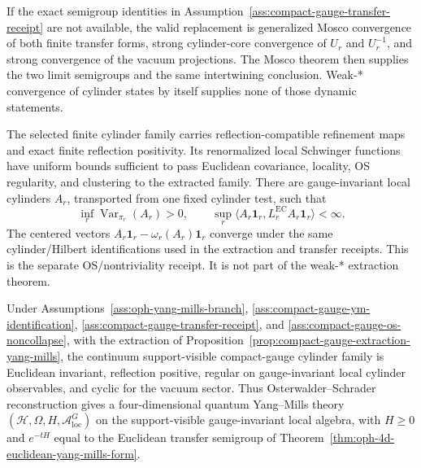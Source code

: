 \begin{remark}
\label{rem:compact-gauge-mosco-alternative}
If the exact semigroup identities in Assumption~\ref{ass:compact-gauge-transfer-receipt} are not
available, the valid replacement is generalized Mosco convergence of both finite transfer forms,
strong cylinder-core convergence of \(U_r\) and \(U_r^{-1}\), and strong convergence of the
vacuum projections. The Mosco theorem then supplies the two limit semigroups and the same
intertwining conclusion. Weak-* convergence of cylinder states by itself supplies none of those
dynamic statements.
\end{remark}

\begin{assumption}
\label{ass:compact-gauge-os-noncollapse}
The selected finite cylinder family carries reflection-compatible refinement maps and exact finite
reflection positivity. Its renormalized local Schwinger functions have uniform bounds sufficient
to pass Euclidean covariance, locality, OS regularity, and clustering to the extracted family.
There are gauge-invariant local cylinders \(A_r\), transported from one fixed cylinder
test, such that
\[
\inf_r\operatorname{Var}_{\pi_r}(A_r)>0,
\qquad
\sup_r\langle A_r\mathbf 1_r,L_r^{\mathrm{EC}}A_r\mathbf 1_r\rangle<\infty.
\]
The centered vectors \(A_r\mathbf 1_r-\omega_r(A_r)\mathbf 1_r\) converge under the same
cylinder/Hilbert identifications used in the extraction and transfer receipts.
This is the separate OS/nontriviality receipt. It is not part of the weak-* extraction theorem.
\end{assumption}

\begin{theorem}
\label{thm:compact-gauge-os-reconstruction}
Under Assumptions~\ref{ass:oph-yang-mills-branch},
\ref{ass:compact-gauge-ym-identification},
\ref{ass:compact-gauge-transfer-receipt}, and
\ref{ass:compact-gauge-os-noncollapse}, with the extraction of
Proposition~\ref{prop:compact-gauge-extraction-yang-mills}, the continuum support-visible
compact-gauge cylinder family is Euclidean invariant, reflection positive, regular on
gauge-invariant local cylinder observables, and cyclic for the vacuum sector. Thus
Osterwalder--Schrader reconstruction gives a four-dimensional quantum Yang--Mills theory
\((\mathcal H,\Omega,H,\mathcal A_{\mathrm{loc}}^G)\) on the support-visible gauge-invariant local
algebra, with \(H\ge0\) and \(e^{-tH}\) equal to the Euclidean transfer semigroup of
Theorem~\ref{thm:oph-4d-euclidean-yang-mills-form}.
\end{theorem}

